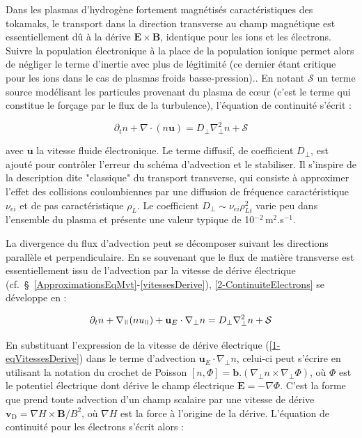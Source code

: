 \begin{refsection}
{Dans les plasmas d'hydrogène fortement magnétisés caractéristiques des tokamaks,
le transport dans la direction transverse au champ magnétique est
essentiellement dû à la dérive $\mathbf E\times\mathbf B$, identique pour les
ions et les électrons. Suivre la population électronique à la place de la
population ionique permet alors de négliger le terme d'inertie avec plus de
légitimité (ce dernier étant critique pour les ions dans le cas de plasmas
froids basse-pression).}.
En notant $\mathcal{S}$ un
terme source modélisant les particules provenant du plasma de
c\oe{}ur (c'est le terme qui constitue le forçage par le flux de la turbulence),
l'équation de continuité s'écrit :

\begin{equation}
\label{2-ContinuiteElectrons}
\partial_t n + \nabla\cdot(n\mathbf{u}) = D_\perp\nabla^2_\perp n + \mathcal{S}
\end{equation}

avec $\mathbf u$ la vitesse fluide électronique. Le terme diffusif, de
coefficient $D_\perp$, est ajouté pour contrôler l'erreur du schéma d'advection et le stabiliser. Il s'inspire de la description
dite "classique" du transport transverse, qui consiste à approximer l'effet des
collisions coulombiennes par une diffusion de fréquence caractéristique
$\nu_{ei}$ et de pas caractéristique $\rho_{L}$. Le coefficient
$D_\perp\sim\nu_{ei}\rho_{Li}^2$ varie peu dans l'ensemble du plasma et présente
une valeur typique de 10$^{-2}\,$m$^2$.s$^{-1}$.

La divergence du flux d'advection peut se décomposer suivant les directions
parallèle et perpendiculaire. En se souvenant que le flux de matière
transverse est essentiellement issu de l'advection par la vitesse de dérive électrique
(cf.~\S~\ref{ApproximationsEqMvt}-\ref{vitessesDerive}), \eqref{2-ContinuiteElectrons}
se développe en :

\begin{equation}
\label{2-ContinuiteElectrons2}
\partial_t n + \nabla_\para(nu_{\para}) +
\mathbf{u}_E\cdot\nabla_\perp n = D_\perp\nabla^2_\perp n + \mathcal{S}
\end{equation}

En substituant l'expression de la vitesse de dérive électrique
(\eqref{1-eqVitessesDerive}) dans le terme d'advection
$\mathbf{u}_E\cdot\nabla_\perp n$, celui-ci peut s'écrire en utilisant la
notation du crochet de Poisson $[n,\Phi]=\mathbf{b}.(\nabla_\perp
n\times\nabla_\perp\Phi)$, où $\Phi$ est le potentiel
électrique dont dérive le champ électrique $\mathbf E=-\nabla\Phi$. C'est la
forme que prend toute advection d'un champ scalaire par une vitesse de dérive
$\mathbf{v}_\text{D}=\nabla H\times\mathbf{B}/B^2$, où $\nabla H$ est la force
à l'origine de la dérive. L'équation de continuité pour les électrons s'écrit alors :


\end{refsection}
